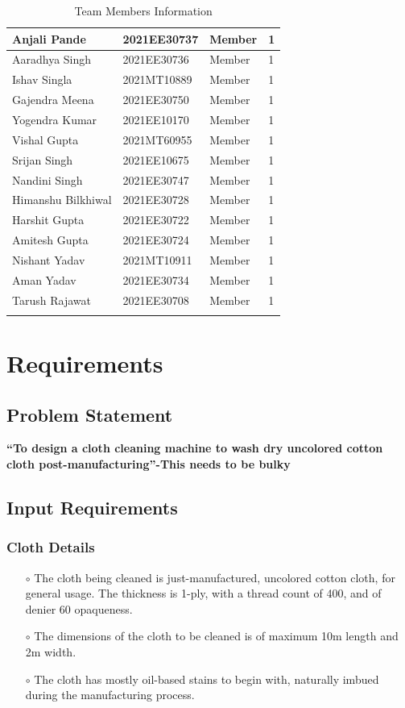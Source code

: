 \documentclass[12pt]{article}
\begin{document}
\begin{longtable}{|P{3.8cm}|P{2.95cm}|P{4cm}|P{1.2cm}|}
  \hline
  Anjali Pande & 2021EE30737 & Member & 1 \\
  \hline
  Aaradhya Singh & 2021EE30736 & Member & 1 \\
  \hline
  Ishav Singla & 2021MT10889 & Member & 1 \\
  \hline
  Gajendra Meena & 2021EE30750 & Member & 1 \\
  \hline
  Yogendra Kumar & 2021EE10170 & Member & 1 \\
  \hline
  Vishal Gupta & 2021MT60955 & Member & 1 \\
  \hline
  Srijan Singh & 2021EE10675 & Member & 1 \\
  \hline
  Nandini Singh & 2021EE30747 & Member & 1 \\
  \hline
  Himanshu Bilkhiwal & 2021EE30728 & Member & 1 \\
  \hline
  Harshit Gupta & 2021EE30722 & Member & 1 \\
  \hline
  Amitesh Gupta & 2021EE30724 & Member & 1 \\
  \hline
  Nishant Yadav & 2021MT10911 & Member & 1 \\
  \hline
  Aman Yadav & 2021EE30734 & Member & 1 \\
  \hline
  Tarush Rajawat & 2021EE30708 & Member & 1 \\
  \hline
\caption{Team Members Information}
\end{longtable}
\newpage

\section{Requirements}
\subsection{Problem Statement}
\begin{center}
    \textbf{``To design a cloth cleaning machine to wash dry uncolored cotton cloth post-manufacturing''-This needs to be bulky}
\end{center}

\subsection{Input Requirements}
\subsubsection{Cloth Details}
\begin{itemize}
    \item[$\scriptstyle\circ$] The cloth being cleaned is just-manufactured, uncolored cotton cloth, for general usage. The thickness is 1-ply, with a thread count of 400, and of denier 60 opaqueness.
    \item[$\scriptstyle\circ$] The dimensions of the cloth to be cleaned is of maximum 10m length and 2m width.
    \item[$\scriptstyle\circ$] The cloth has mostly oil-based stains to begin with, naturally imbued during the manufacturing process.
\end{itemize}
\end{document}
